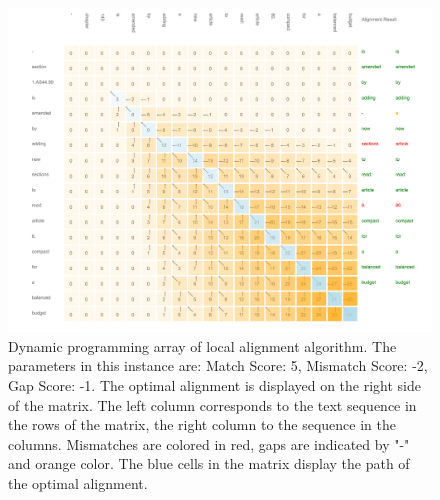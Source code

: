 \documentclass[12pt]{article} %
\begin{document}
\begin{figure}[ht!]
	\centering
	\includegraphics[width=1.05\textwidth]{figures/sm.png}
    \caption{Dynamic programming array of local alignment algorithm. The parameters in this instance are: Match Score: 5, Mismatch Score: -2, Gap Score: -1. The optimal alignment is displayed on the right side of the matrix. The left column corresponds to the text sequence in the rows of the matrix, the right column to the sequence in the columns. Mismatches are colored in red, gaps are indicated by "-" and orange color. The blue cells in the matrix display the path of the optimal alignment.}
    \label{fig:score_matrix}
\end{figure}
\end{document}
